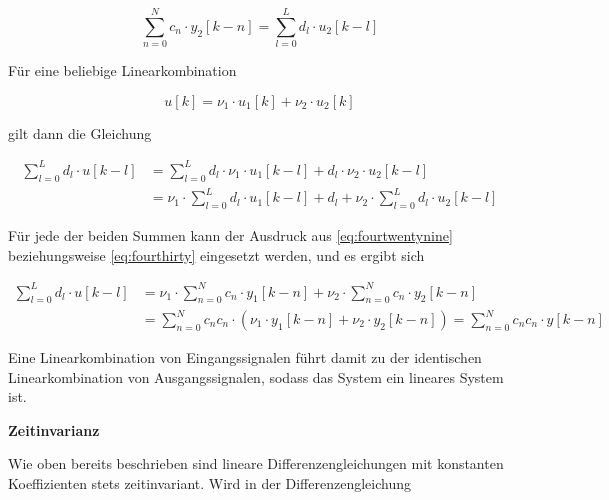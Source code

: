 \begin{equation}\label{eq:fourthirty}
\sum _{n=0}^{N}c_{n} \cdot y_{2} \left[k-n\right] =\sum _{l=0}^{L}d_{l} \cdot u_{2} \left[k-l\right] 
\end{equation}

\noindent F\"{u}r eine beliebige Linearkombination 

\begin{equation}\label{eq:fourthirtyone}
u\left[k\right]=\nu _{1} \cdot u_{1} \left[k\right]+\nu _{2} \cdot u_{2} \left[k\right]
\end{equation}

\noindent gilt dann die Gleichung

\begin{equation}\label{eq:fourthirtytwo}
\begin{split}
\sum _{l=0}^{L}d_{l} \cdot u\left[k-l\right]  & = \sum _{l=0}^{L}d_{l} \cdot \nu _{1} \cdot u_{1} \left[k-l\right]+d_{l} \cdot \nu _{2} \cdot u_{2} \left[k-l\right]  \\ 
& = \nu _{1} \cdot \sum _{l=0}^{L}d_{l} \cdot u_{1} \left[k-l\right]+d_{l} + \nu_{2}  \cdot \sum _{l=0}^{L}d_{l} \cdot  u_{2}\left[k-l\right] 
\end{split}
\end{equation}

\noindent F\"{u}r jede der beiden Summen kann der Ausdruck aus \eqref{eq:fourtwentynine} beziehungsweise \eqref{eq:fourthirty} eingesetzt werden, und es ergibt sich

\begin{equation}\label{eq:fourthirtythree}
\begin{split}
\sum _{l=0}^{L}d_{l} \cdot u\left[k-l\right] & = \nu _{1} \cdot \sum _{n=0}^{N}c_{n} \cdot y_{1} \left[k-n\right] +\nu _{2} \cdot \sum _{n=0}^{N}c_{n} \cdot y_{2} \left[k-n\right] \\
& = \sum _{n=0}^{N}c_{n} c_{n} \cdot ( \nu_{1} \cdot y_{1} [k-n] + \nu_{2} \cdot y_{2} [k-n]) = \sum _{n=0}^{N}c_{n} c_{n} \cdot y[k-n]
\end{split}
\end{equation}

\noindent Eine Linearkombination von Eingangssignalen f\"{u}hrt damit zu der identischen Linearkombination von Ausgangssignalen, sodass das System ein lineares System ist.\bigskip

{\selectfont
\noindent\textbf{Zeitinvarianz}} \smallskip

\noindent Wie oben bereits beschrieben sind lineare Differenzengleichungen mit konstanten Koeffizienten stets zeitinvariant. Wird in der Differenzengleichung


